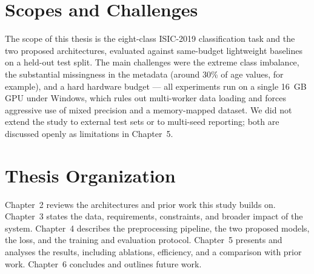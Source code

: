 \section{Scopes and Challenges}

The scope of this thesis is the eight-class ISIC-2019 classification task and
the two proposed architectures, evaluated against same-budget lightweight
baselines on a held-out test split. The main challenges were the extreme class
imbalance, the substantial missingness in the metadata (around 30\% of age
values, for example), and a hard hardware budget --- all experiments run on a
single 16~GB GPU under Windows, which rules out multi-worker data loading and
forces aggressive use of mixed precision and a memory-mapped dataset. We did not
extend the study to external test sets or to multi-seed reporting; both are
discussed openly as limitations in Chapter~5.

\section{Thesis Organization}

Chapter~2 reviews the architectures and prior work this study builds on.
Chapter~3 states the data, requirements, constraints, and broader impact of the
system. Chapter~4 describes the preprocessing pipeline, the two proposed models,
the loss, and the training and evaluation protocol. Chapter~5 presents and
analyses the results, including ablations, efficiency, and a comparison with
prior work. Chapter~6 concludes and outlines future work.
